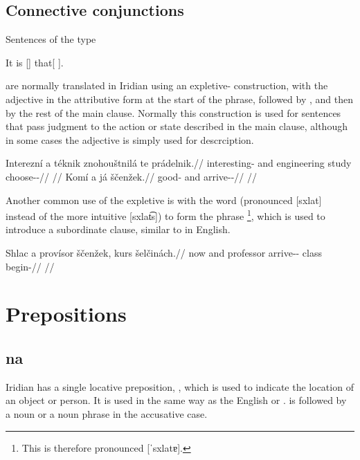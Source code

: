 \subsection{Connective conjunctions}\label{sec:conn-conj}

Sentences of the type

\ex
It is [] that[ ].
\xe

are normally translated in Iridian using an expletive- construction, with the adjective in the attributive form at the start of the phrase, followed by , and then by the rest of the main clause. Normally this construction is used for sentences that pass judgment to the action or state described in the main clause, although in some cases the adjective is simply used for descrciption.

\pex
\begingl
    \gla Interezní a téknik znohouštnilá te prádelnik.//
    \glb interesting-\Att{} and engineering study  choose-\Pv{}-\Pf{}//
    \glft {}//
\endgl
\xe
\pex
\begingl
    \gla Komí a já ščenžek.//
    \glb good-\Att{} and \Second{}\Sg{} arrive-\Av{}-\Pf{}//
    \glft {}//
\endgl
\xe

Another common use of the expletive  is with the word  (pronounced [sxlat] instead of the more intuitive [sxlat͡s]) to form the phrase \footnote{This is therefore pronounced [ˈsxlatɐ].}, which is used to introduce a subordinate clause, similar to  in English.

\pex
\begingl
    \gla Shlac a provísor ščenžek, kurs šelčinách.//
    \glb now and professor arrive-\Av{}-\Pf{} class begin-//
    \glft {}//
\endgl
\xe


\section{Prepositions}

\subsection{na}

Iridian has a single locative preposition, , which is used to indicate the location of an object or person. It is used in the same way as the English  or .  is followed by a noun or a noun phrase in the accusative case.

